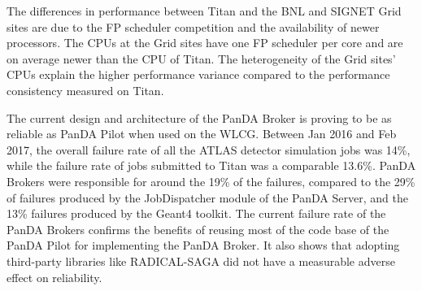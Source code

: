 
The differences in performance between Titan and the BNL and SIGNET Grid sites
are due to the FP scheduler competition and the availability of newer
processors. The CPUs at the Grid sites have one FP scheduler per core and are on
average newer than the CPU of Titan. The heterogeneity of the Grid sites' CPUs
explain the higher performance variance compared to the performance consistency
measured on Titan.



The current design and architecture of the PanDA Broker is proving to be as
reliable as PanDA Pilot when used on the WLCG. Between Jan 2016 and Feb 2017,
the overall failure rate of all the ATLAS detector simulation jobs was 14\%,
while the failure rate of jobs submitted to Titan was a comparable 13.6\%. PanDA
Brokers were responsible for around the 19\% of the failures, compared to the
29\% of failures produced by the JobDispatcher module of the PanDA Server, and
the 13\% failures produced by the Geant4 toolkit. The current failure rate of
the PanDA Brokers confirms the benefits of reusing most of the code base of the
PanDA Pilot for implementing the PanDA Broker. It also shows that adopting
third-party libraries like RADICAL-SAGA did not have a measurable adverse effect
on reliability.


